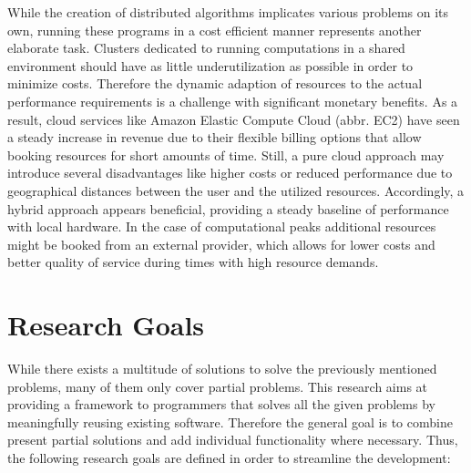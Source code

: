 While the creation of distributed algorithms implicates various problems on its own, running these programs in a cost efficient manner represents another elaborate task. Clusters dedicated to running computations in a shared environment should have as little underutilization as possible in order to minimize costs. Therefore the dynamic adaption of resources to the actual performance requirements is a challenge with significant monetary benefits. As a result, cloud services like Amazon Elastic Compute Cloud (abbr. EC2) have seen a steady increase in revenue due to their flexible billing options that allow booking resources for short amounts of time\cite{gartner_2017}. Still, a pure cloud approach may introduce several disadvantages like higher costs or reduced performance due to geographical distances between the user and the utilized resources. Accordingly, a hybrid approach appears beneficial, providing a steady baseline of performance with local hardware. In the case of computational peaks additional resources might be booked from an external provider, which allows for lower costs and better quality of service during times with high resource demands.

\section*{Research Goals}
\label{goals}
While there exists a multitude of solutions to solve the previously mentioned problems, many of them only cover partial problems. This research aims at providing a framework to programmers that solves all the given problems by meaningfully reusing existing software. Therefore the general goal is to combine present partial solutions and add individual functionality where necessary. Thus, the following research goals are defined in order to streamline the development:

